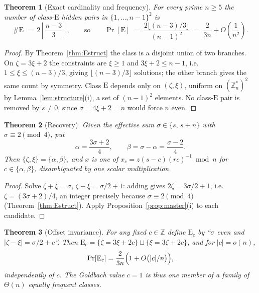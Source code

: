 \documentclass[11pt,a4paper]{article}
\theoremstyle{plain}
\newtheorem{theorem}{Theorem}
\theoremstyle{definition}
\theoremstyle{remark}
\newcommand{\Zs}{\mathbb{Z}_n^{*}}
\newcommand{\Zz}{\mathbb{Z}}
\newcommand{\Pro}{\Pr}
\newcommand{\clE}{\mathrm{E}}
\begin{document}
\begin{theorem}[Exact cardinality and frequency]\label{thm:Ecount}
For every prime $n \ge 5$ the number of class-$\clE$ hidden pairs in $\{1,\dots,n-1\}^{2}$ is
\begin{equation}\label{eq:Ecount}
  \#\clE \;=\; 2\left\lfloor \frac{n-3}{3}\right\rfloor,
  \qquad\text{so}\qquad
  \Pro[\clE] \;=\; \frac{2\lfloor (n-3)/3\rfloor}{(n-1)^{2}} \;=\; \frac{2}{3n} + O\!\left(\frac{1}{n^{2}}\right).
\end{equation}
\end{theorem}

\begin{proof}
By Theorem~\ref{thm:Estruct} the class is a disjoint union of two branches. On $\zeta = 3\xi+2$
the constraints are $\xi \ge 1$ and $3\xi+2 \le n-1$, i.e.\ $1 \le \xi \le (n-3)/3$, giving
$\lfloor (n-3)/3\rfloor$ solutions; the other branch gives the same count by symmetry. Class
$\clE$ depends only on $(\zeta,\xi)$, uniform on $(\Zs)^{2}$ by
Lemma~\ref{lem:structure}(i), a set of $(n-1)^{2}$ elements. No class-$\clE$ pair is removed by
$s \neq 0$, since $\sigma = 4\xi+2 = n$ would force $n$ even.
\end{proof}

\begin{theorem}[Recovery]\label{thm:Erec}
Given the effective sum $\sigma \in \{s,\,s+n\}$ with $\sigma \equiv 2 \pmod 4$, put
\begin{equation}\label{eq:albe}
  \alpha = \frac{3\sigma+2}{4}, \qquad \beta = \sigma - \alpha = \frac{\sigma-2}{4}.
\end{equation}
Then $\{\zeta,\xi\} = \{\alpha,\beta\}$, and $x$ is one of
$x_c = z(s-c)(rc)^{-1}\bmod n$ for $c \in \{\alpha,\beta\}$, disambiguated by one scalar
multiplication.
\end{theorem}

\begin{proof}
Solve $\zeta+\xi = \sigma$, $\zeta-\xi = \sigma/2+1$: adding gives $2\zeta = 3\sigma/2 + 1$, i.e.\
$\zeta = (3\sigma+2)/4$, an integer precisely because $\sigma \equiv 2 \pmod 4$
(Theorem~\ref{thm:Estruct}). Apply Proposition~\ref{prop:master}(i) to each candidate.
\end{proof}

\begin{theorem}[Offset invariance]\label{thm:offset}
For any fixed $c \in \Zz$ define $\clE_c$ by ``$\sigma$ even and
$|\zeta-\xi| = \sigma/2 + c$''. Then
$\clE_c = \{\zeta = 3\xi+2c\} \sqcup \{\xi = 3\zeta+2c\}$, and for $|c| = o(n)$,
\[
  \Pro[\clE_c] = \frac{2}{3n}\Bigl(1 + O\bigl(|c|/n\bigr)\Bigr),
\]
independently of $c$. The Goldbach value $c=1$ is thus one member of a family of $\Theta(n)$
equally frequent classes.
\end{theorem}
\end{document}
